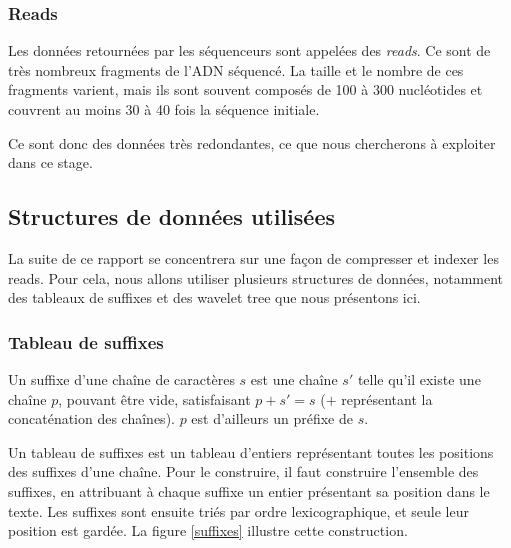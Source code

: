 \subsubsection{Reads}
Les données retournées par les séquenceurs sont appelées des \emph{reads}. Ce sont de très nombreux fragments de l'ADN séquencé. La taille et le nombre de ces fragments varient, mais ils sont souvent composés de 100 à 300 nucléotides et couvrent au moins 30 à 40 fois la séquence initiale. 

Ce sont donc des données très redondantes, ce que nous chercherons à exploiter dans ce stage.


\subsection{Structures de données utilisées}
La suite de ce rapport se concentrera sur une façon de compresser et indexer les reads. Pour cela, nous allons utiliser plusieurs structures de données, notamment des tableaux de suffixes et des wavelet tree que nous présentons ici.

\subsubsection{Tableau de suffixes}
Un suffixe d'une chaîne de caractères $s$ est une chaîne $s'$ telle qu'il existe une chaîne $p$, pouvant être vide, satisfaisant $p + s' = s$ ($+$ représentant la concaténation des chaînes). $p$ est d'ailleurs un préfixe de $s$.

Un tableau de suffixes est un tableau d'entiers représentant toutes les positions des suffixes d'une chaîne. Pour le construire, il faut construire l'ensemble des suffixes, en attribuant à chaque suffixe un entier présentant sa position dans le texte. Les suffixes sont ensuite triés par ordre lexicographique, et seule leur position est gardée. La figure \ref{suffixes} illustre cette construction.

